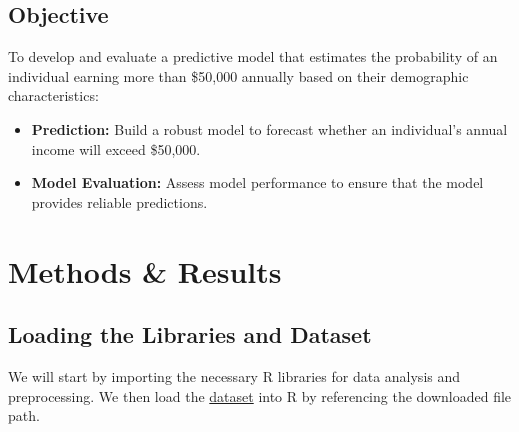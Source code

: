 \documentclass[
  letterpaper,
  DIV=11,
  numbers=noendperiod]{scrartcl}
\providecommand{\tightlist}{%
  \setlength{\itemsep}{0pt}\setlength{\parskip}{0pt}}\usepackage{longtable,booktabs,array}
\begin{document}
\hypertarget{objective}{%
\subsection{\texorpdfstring{\textbf{Objective}}{Objective}}\label{objective}}

To develop and evaluate a predictive model that estimates the
probability of an individual earning more than \$50,000 annually based
on their demographic characteristics:

\begin{itemize}
\tightlist
\item
  \textbf{Prediction:} Build a robust model to forecast whether an
  individual's annual income will exceed \$50,000.
\item
  \textbf{Model Evaluation:} Assess model performance to ensure that the
  model provides reliable predictions.
\end{itemize}

\hypertarget{methods-results}{%
\section{Methods \& Results}\label{methods-results}}

\hypertarget{loading-the-libraries-and-dataset}{%
\subsection{Loading the Libraries and
Dataset}\label{loading-the-libraries-and-dataset}}

We will start by importing the necessary R libraries for data analysis
and preprocessing. We then load the
\href{https://archive.ics.uci.edu/dataset/2/adult}{dataset} into R by
referencing the downloaded file path.
\end{document}
